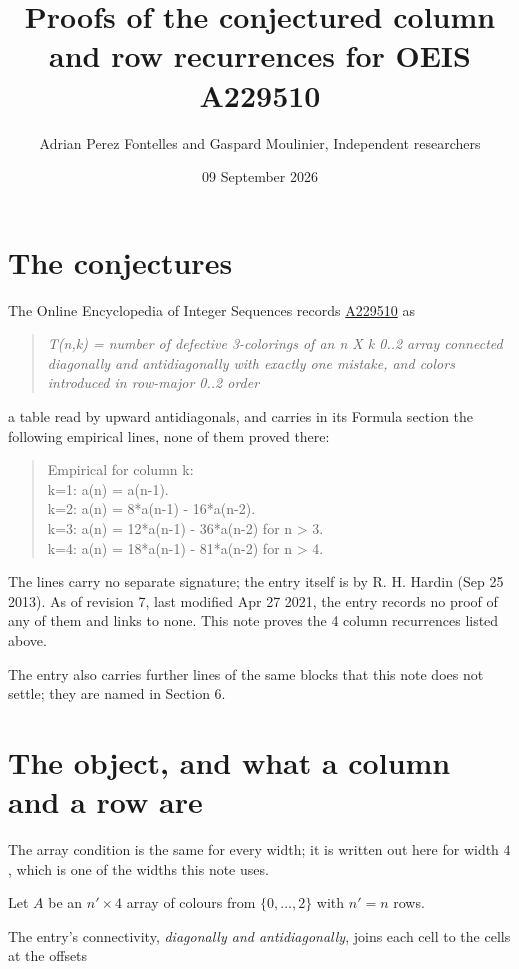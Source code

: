 \documentclass[11pt]{article}
\title{Proofs of the conjectured column and row recurrences for OEIS A229510}
\author{Adrian Perez Fontelles and Gaspard Moulinier, Independent researchers}
\date{09 September 2026}
\theoremstyle{definition}
\begin{document}
\maketitle
\section{The conjectures}

The Online Encyclopedia of Integer Sequences records \href{https://oeis.org/A229510}{A229510} as

\begin{quote}\itshape T(n,k) = number of defective 3-colorings of an n X k 0..2 array connected diagonally and antidiagonally with exactly one mistake, and colors introduced in row-major 0..2 order\end{quote}

a table read by upward antidiagonals, and carries in its Formula section the following empirical lines, none of them proved there:

\begin{quote}\ttfamily Empirical for column k:\\
k=1: a(n) = a(n-1).\\k=2: a(n) = 8*a(n-1) - 16*a(n-2).\\k=3: a(n) = 12*a(n-1) - 36*a(n-2) for n > 3.\\k=4: a(n) = 18*a(n-1) - 81*a(n-2) for n > 4.\end{quote}

The lines carry no separate signature; the entry itself is by R. H. Hardin (Sep 25 2013). As of revision 7, last modified Apr 27 2021, the entry records no proof of any of them and links to none. This note proves the 4 column recurrences listed above.

The entry also carries further lines of the same blocks that this note does not settle; they are named in Section 6.

\section{The object, and what a column and a row are}

The array condition is the same for every width; it is written out here for width $4$, which is one of the widths this note uses.

Let $A$ be an $n' \times 4$ array of colours from $\{0,\dots,2\}$ with $n' = n$ rows.

The entry's connectivity, {\itshape diagonally and antidiagonally}, joins each cell to the cells at the offsets
\end{document}
